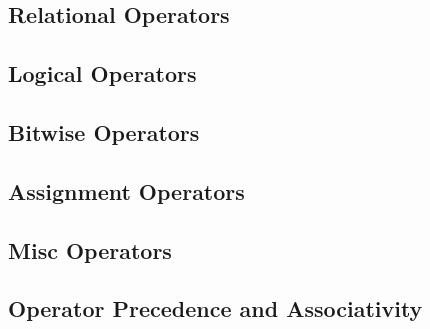 \documentclass[10pt,a4paper]{scrartcl}
\begin{document}
\begin{multicols*}{2}
\subsection{Relational Operators}

\subsection{Logical Operators}

\subsection{Bitwise Operators}

\subsection{Assignment Operators}

\subsection{Misc Operators}

\subsection{Operator Precedence and Associativity}


\end{multicols*}
\end{document}
